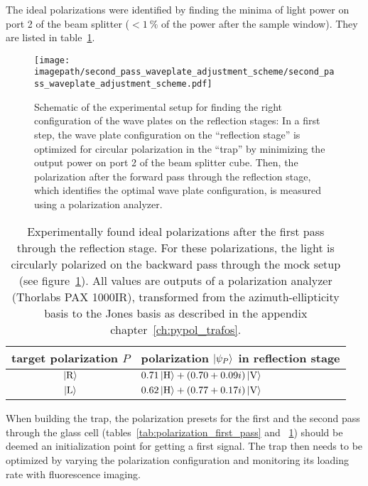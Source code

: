 The ideal polarizations were identified by finding the minima of light power on port 2 of the beam splitter ($< \SI{1}{\percent}$ of the power after the sample window). They are listed in table~\ref{tab:polarization_second_pass}.

\begin{figure}
    \centering
    \texttt{[image: \\imagepath/second\_pass\_waveplate\_adjustment\_scheme/second\_pass\_waveplate\_adjustment\_scheme.pdf]}
    \caption{Schematic of the experimental setup for finding the right configuration of the wave plates on the reflection stages: In a first step, the wave plate configuration on the ``reflection stage'' is optimized for circular polarization in the ``trap'' by minimizing the output power on port 2 of the beam splitter cube. Then, the polarization after the forward pass through the reflection stage, which identifies the optimal wave plate configuration, is measured using a polarization analyzer.}\label{fig:second_pass_waveplate_adjustment_scheme}
\end{figure}

\begin{table}
    \centering
    \begin{tabular}{cl}
        \toprule
        \textbf{target polarization $P$} & \textbf{polarization $\Ket{\psi_P}$ in reflection stage} \\
        \toprule
        $\Ket{\text{R}}$ & $0.71 \Ket{\text{H}} + (0.70+0.09i) \Ket{\text{V}}$ \\
        $\Ket{\text{L}}$ & $0.62\Ket{\text{H}} + (0.77+0.17i)\Ket{\text{V}}$ \\
        \bottomrule
    \end{tabular}
    \caption{Experimentally found ideal polarizations after the first pass through the reflection stage. For these polarizations, the light is circularly polarized on the backward pass through the mock setup (see figure~\ref{fig:second_pass_waveplate_adjustment_scheme}). All values are outputs of a polarization analyzer (Thorlabs PAX 1000IR), transformed from the azimuth-ellipticity basis to the Jones basis as described in the appendix chapter~\ref{ch:pypol_trafos}.}
    \label{tab:polarization_second_pass}
\end{table}

When building the trap, the polarization presets for the first and the second pass through the glass cell (tables~\ref{tab:polarization_first_pass} and ~\ref{tab:polarization_second_pass}) should be deemed an initialization point for getting a first signal. The trap then needs to be optimized by varying the polarization configuration and monitoring its loading rate with fluorescence imaging.

